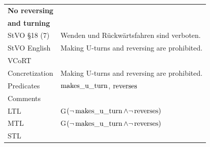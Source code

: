 \begin{table}[H]
	\centering
	\begin{tabular}[t]{ll}
		\toprule
		\textbf{No reversing}&\\ 
		\textbf{and turning} &\\
		\midrule
		StVO \S 18 (7) & Wenden und Rückwärtsfahren sind verboten.\\
		
		StVO English & Making U-turns and reversing are prohibited.\\
		
		VCoRT  &  \\
		
		Concretization &  Making U-turns and reversing are prohibited.\\
		
		Predicates & $\operatorname*{makes\_u\_turn}$, $\operatorname*{reverses}$\\
		
		Comments &  \\
		
		LTL & G$(\neg \operatorname*{makes\_u\_turn} \land \neg \operatorname*{reverses})$ \\
		MTL & G$(\neg \operatorname*{makes\_u\_turn} \land \neg \operatorname*{reverses})$\\
		STL & \\
		\bottomrule
	\end{tabular}
\end{table}

